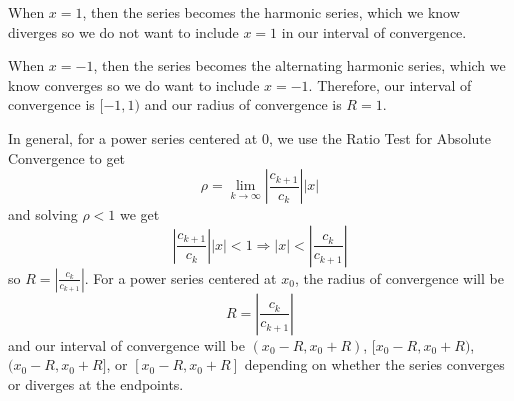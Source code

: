 \documentclass{article}
\begin{document}
When $x = 1$, then the series becomes the harmonic series, which we know diverges so we do not want to include $x = 1$ in our interval of convergence.

When $x = -1$, then the series becomes the alternating harmonic series, which we know converges so we do want to include $x = -1$. Therefore, our interval of convergence is $[-1, 1)$ and our radius of convergence is $R = 1$.

In general, for a power series centered at $0$, we use the Ratio Test for Absolute Convergence to get
\[
\rho = \lim_{k \to \infty} \left| \frac{c_{k+1}}{c_k} \right| |x|
\]
and solving $\rho < 1$ we get
\[
\left| \frac{c_{k+1}}{c_k} \right| |x| < 1 \Rightarrow |x| < \left| \frac{c_k}{c_{k+1}} \right|
\]
so $R = \left| \frac{c_k}{c_{k+1}} \right|$. For a power series centered at $x_0$, the radius of convergence will be
\[
R = \left| \frac{c_k}{c_{k+1}} \right|
\]
and our interval of convergence will be $(x_0 - R, x_0 + R)$, $[x_0 - R, x_0 + R)$, $(x_0 - R, x_0 + R]$, or $[x_0 - R, x_0 + R]$ depending on whether the series converges or diverges at the endpoints.
\end{document}
